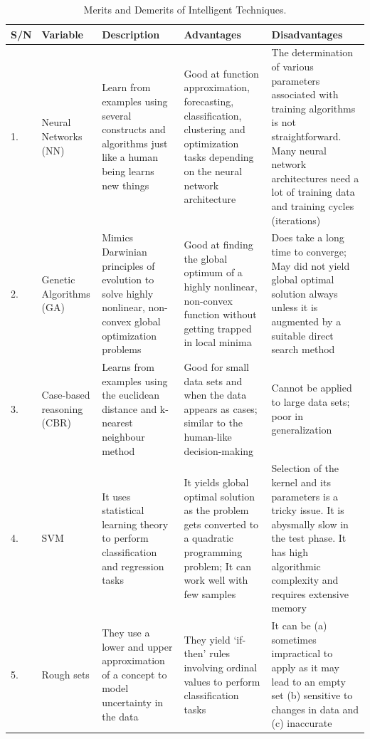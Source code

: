 \begin{table}
\small
\begin{center}
 \begin{tabular}{|p{0.5cm}|p{2cm}|p{3.75cm}|p{3.75cm}|p{3.75cm}|} 
 \hline
 S/N & Variable  & Description & Advantages & Disadvantages   \\ [0.5ex] 
 \hline\hline

    1. & Neural Networks (NN) & Learn from examples using several constructs and algorithms just like a human being learns new things & Good at function approximation, forecasting, classification, clustering and optimization tasks depending on the neural network architecture & The determination of various parameters associated with training algorithms is not straightforward. Many neural network architectures need a lot of training data and training cycles (iterations) \\ \hline
    
    2. & Genetic Algorithms (GA) & Mimics Darwinian principles of evolution to solve highly nonlinear, non-convex global optimization problems & Good at finding the global optimum of a highly nonlinear, non-convex function without getting trapped in local minima & Does take a long time to converge; May did not yield global optimal solution always unless it is augmented by a suitable direct search method \\ \hline
    
    3. & Case-based reasoning (CBR) & Learns from examples using the euclidean distance and k-nearest neighbour method & Good for small data sets and when the data appears as cases; similar to the human-like decision-making & Cannot be applied to large data sets; poor in generalization \\ \hline
    
    4. & SVM & It uses statistical learning theory to perform classification and regression tasks & It yields global optimal solution as the problem gets converted to a quadratic programming problem; It can work well with few samples & Selection of the kernel and its parameters is a tricky issue. It is abysmally slow in the test phase. It has high algorithmic complexity and requires extensive memory \\ \hline
    
    5. & Rough sets & They use a lower and upper approximation of a concept to model uncertainty in the data & They yield `if-then’ rules involving ordinal values to perform classification tasks & It can be (a) sometimes impractical to apply as it may lead to an empty set (b) sensitive to changes in data and (c) inaccurate \\ 

\hline
\end{tabular}
\end{center}

    \caption{Merits and Demerits of Intelligent Techniques.}
\label{table:intelligent_techniques}
\end{table}

